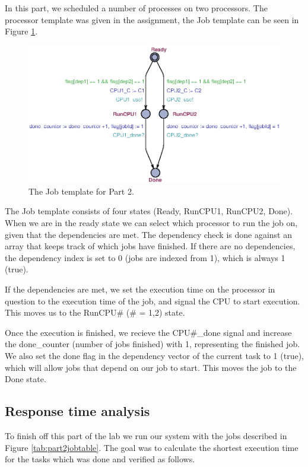 \documentclass[a4paper,10pt]{article}
\begin{document}
In this part, we scheduled a number of processes on two processors. The processor template was given in the assignment, the Job template can be seen in Figure \ref{img:part2extendedJob}.

\begin{figure}[h]
  \center
  \includegraphics{Part2Extended.eps}
  \caption{The Job template for Part 2.}
  \label{img:part2extendedJob}
\end{figure}

The Job template consists of four states (Ready, RunCPU1, RunCPU2, Done). When we are in the ready state we can select which processor to run the job on, given that the dependencies are met. The dependency check is done against an array that keeps track of which jobs have finished. If there are no dependencies, the dependency index is set to 0 (jobs are indexed from 1), which is always 1 (true).

If the dependencies are met, we set the execution time on the processor in question to the execution time of the job, and signal the CPU to start execution. This moves us to the RunCPU\# (\# = 1,2) state.

Once the execution is finished, we recieve the CPU\#\_done signal and increase the done\_counter (number of jobs finished) with 1, representing the finished job. We also set the done flag in the dependency vector of the current task to 1 (true), which will allow jobs that depend on our job to start. This moves the job to the Done state.

\subsection*{Response time analysis}

To finish off this part of the lab we run our system with the jobs described in Figure \ref{tab:part2jobtable}. The goal was to calculate the shortest execution time for the tasks which was done and verified as follows.
\end{document}
